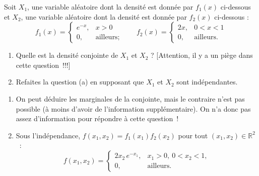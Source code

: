 \begin{exercice}
Soit $X_1$, une variable aléatoire dont la densité est donnée par $f_1(x)$ ci-dessous et
$X_2$, une variable aléatoire dont la densité est donnée par $f_2(x)$ ci-dessous :
\[
  f_1(x)=\begin{cases} e^{-x}, & x>0\\ 0, & \text{ailleurs}; \end{cases}
  \qquad
  f_2(x)=\begin{cases} 2x, & 0<x<1\\ 0, & \text{ailleurs}. \end{cases}
\]
\begin{enumerate}[label=(\alph*)]
  \item Quelle est la densité conjointe de $X_1$ et $X_2$ ? [Attention, il y a un piège dans
  cette question~!!!]
  \item Refaites la question (a) en supposant que $X_1$ et $X_2$ sont indépendantes.
\end{enumerate}
\begin{solution}
\begin{enumerate}[label=(\alph*)]
  \item On peut déduire les marginales de la conjointe, mais le contraire n'est pas possible
  (à moins d'avoir de l'information supplémentaire). On n'a donc pas assez d'information pour
  répondre à cette question~!
  \item Sous l'indépendance, $f(x_1,x_2)=f_1(x_1)f_2(x_2)$ pour tout $(x_1,x_2)\in\mathbb{R}^2$~:
  \[
    f(x_1,x_2)=\begin{cases} 2x_2\,e^{-x_1}, & x_1>0,\ 0<x_2<1,\\ 0, & \text{ailleurs}.\end{cases}
  \]
\end{enumerate}
\end{solution}
\end{exercice}

